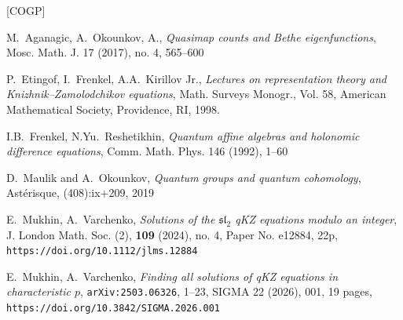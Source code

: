 \documentclass[12pt]{amsart}
\let\frak\mathfrak
\theoremstyle{definition} %
\numberwithin{equation}{section}
\theoremstyle{definition}
\let\bi\bibitem
\begin{document}
\bigskip
\begin{thebibliography}{[COGP]}
\normalsize
\frenchspacing
\raggedbottom

\bi[AO]{AO}
M.~Aganagic,  A.~Okounkov, A.,
{\it Quasimap counts and Bethe eigenfunctions},
Mosc. Math. J. 17 (2017), no. 4, 565--600

\bi[EFK]{EFK}
P.~Etingof, I.~Frenkel, A.A.~Kirillov Jr.,
{\it Lectures on representation theory and Knizhnik--Zamolodchikov
equations}, Math. Surveys Monogr., Vol. 58, American Mathematical Society, Providence, RI, 1998.

\bi[FR]{FR}
I.B.~Frenkel, N.Yu.~Reshetikhin, {\it
Quantum affine algebras and holonomic difference equations}, Comm. Math.
Phys. 146 (1992), 1--60


\bi[MO]{MO}  
D.~Maulik and A.~Okounkov, {\it Quantum groups and quantum cohomology}, Astérisque, (408):ix+209, 2019

\bi[MV1]{MV1} 
E.~Mukhin, A.~Varchenko, {\it Solutions of the $\frak{sl}_2$ qKZ equations modulo an integer},
J. London Math. Soc. (2), {\bf 109} (2024), no. 4, Paper No. e12884, 22p,
\\
{\tt https://doi.org/10.1112/jlms.12884}

\bi[MV2]{MV2} 
E.~Mukhin, A.~Varchenko,
{\it Finding all solutions of qKZ equations in characteristic $p$},
{\tt arXiv:2503.06326}, 1--23, SIGMA 22 (2026), 001, 19 pages,
\\
{\tt  https://doi.org/10.3842/SIGMA.2026.001}
 
 




\end{thebibliography}
\end{document}
